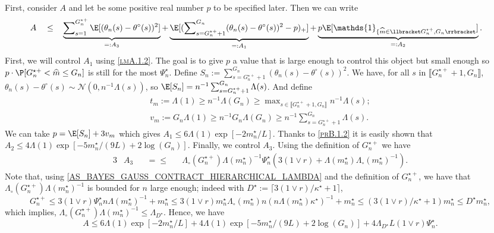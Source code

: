 First, consider $A$ and let be some positive real number $p$ to be specified later.
Then we can write
\begin{alignat*}{3}
& A && \leq && \underbrace{\sum\nolimits_{s = 1}^{G_{n}^{\star+}} \E[(\theta_{n}(s) - \theta^{\circ}(s))^{2}]}_{=: A_{3}} + \underbrace{\E [ (\sum\nolimits_{s = G_{n}^{\star+} + 1}^{G_{n}}(\theta_{n}(s) - \theta^{\circ}(s) )^{2} - p)_{+}]}_{=: A_{1}} + \underbrace{p \E[\mathds{1}_{\{\widehat{m} \in \llbracket G_{n}^{\star+}, G_{n} \rrbracket}]}_{=: A_{2}} .
\end{alignat*}
First, we will control $A_{1}$ using \textsc{\cref{lmA.1.2}}.
The goal is to give $p$ a value that is large enough to control this object but small enough so $p \cdot \P [G_{n}^{\star+} < \widehat{m} \leq G_{n}]$ is still for the most $\Psi_{n}^{\star}$.
Define $S_{n} := \sum\nolimits_{s = G_{n}^{\star+} + 1}^{G_{n}}(\theta_{n}(s) - \theta^{\circ}(s))^{2}$.
We have, for all $s$ in $\llbracket G_{n}^{\star+} + 1, G_{n} \rrbracket$, $\theta_{n}(s) - \theta^{\circ}(s) \sim \mathcal{N}(0, n^{-1} \Lambda(s) )$, so $\E[S_{n}] = n^{-1} \sum\nolimits_{s = G_{n}^{\star+} + 1}^{G_{n}} \Lambda(s)$.
And define
\begin{multline*}
t_{m} := \Lambda(1) \geq n^{-1}\Lambda(G_{n}) \geq \max\nolimits_{s \in \llbracket G_{n}^{\star+} + 1, G_{n} \rrbracket} n^{-1} \Lambda(s);\\
 v_{m} := G_{n} \Lambda(1) \geq n^{-1}G_{n} \Lambda(G_{n}) \geq  n^{-1} \sum\nolimits_{s = G_{n}^{\star+} + 1}^{G_{n}} \Lambda(s).
 \end{multline*}
We can take $p = \E[S_{n}] + 3 v_{m}$ which gives $A_{1} \leq 6 \Lambda(1) \exp[- 2 m_{n}^{\star}/L]$.
Thanks to \textsc{\cref{prB.1.2}} it is easily shown that $A_{2} \leq 4 \Lambda(1) \exp[-5 m_{n}^{\star}/(9 L) + 2 \log (G_{n})]$.
Finally, we control $A_{3}.$
Using the definition of $G_{n}^{\star+}$ we have
\begin{alignat*}{3}
& A_{3} && = \leq && \Lambda_{\circ}(G_{n}^{\star+})\Lambda(m_{n}^{\star})^{-1} \Psi_{n}^{\star} (3 (1 \vee r) + \Lambda(m_{n}^{\star})\Lambda_{\circ}(m_{n}^{\star})^{-1}).
\end{alignat*}
Note that, using \cref{AS_BAYES_GAUSS_CONTRACT_HIERARCHICAL_LAMBDA} and the definition of $G_{n}^{\star+}$, we have that $\Lambda_{\circ}(G_{n}^{\star+})\Lambda(m_{n}^{\star})^{-1}$ is bounded for $n$ large enough; indeed with $D^{\star} := \lceil 3 ( 1 \vee r ) / \kappa^{\star} + 1\rceil$,
\[ G_{n}^{\star+} \leq 3 (1 \vee r ) \Psi_{n}^{\star} n\Lambda(m_{n}^{\star})^{-1} + m_{n}^{\star} \leq 3 (1 \vee r ) m_{n}^{\star} \Lambda_{\circ}(m_{n}^{\star}) n(n\Lambda(m_{n}^{\star}) \kappa^{\star})^{-1} + m_{n}^{\star} \leq (3(1 \vee r )/\kappa^{\star} + 1) m_{n}^{\star} \leq D^{\star} m_{n}^{\star},\]
which implies, $\Lambda_{\circ}(G_{n}^{\star+})\Lambda(m_{n}^{\star})^{-1} \leq \Lambda_{D^{\star}}$.
Hence, we have
\[A \leq 6 \Lambda(1) \exp[- 2 m_{n}^{\star}/L] + 4 \Lambda(1) \exp[-5 m_{n}^{\star}/(9 L) + 2 \log (G_{n})] +  4 \Lambda_{D^{\star}} L (1 \vee r) \Psi_{n}^{\star}.\]

